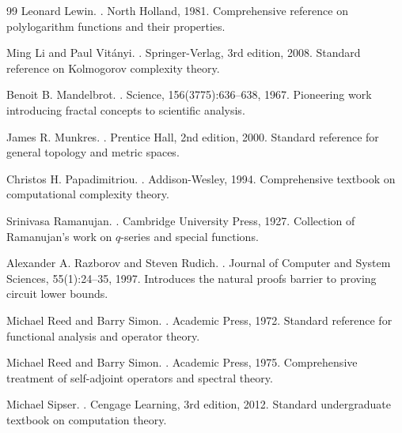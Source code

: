 \documentclass[12pt]{article}
\theoremstyle{plain}
\theoremstyle{definition}
\begin{document}
\begin{thebibliography}{99}
Leonard Lewin.
.
\newblock North Holland, 1981.
\newblock Comprehensive reference on polylogarithm functions and their properties.

Ming Li and Paul Vitányi.
.
\newblock Springer-Verlag, 3rd edition, 2008.
\newblock Standard reference on Kolmogorov complexity theory.

Benoit B. Mandelbrot.
.
\newblock Science, 156(3775):636--638, 1967.
\newblock Pioneering work introducing fractal concepts to scientific analysis.

James R. Munkres.
.
\newblock Prentice Hall, 2nd edition, 2000.
\newblock Standard reference for general topology and metric spaces.

Christos H. Papadimitriou.
.
\newblock Addison-Wesley, 1994.
\newblock Comprehensive textbook on computational complexity theory.

Srinivasa Ramanujan.
.
\newblock Cambridge University Press, 1927.
\newblock Collection of Ramanujan's work on $q$-series and special functions.

Alexander A. Razborov and Steven Rudich.
.
\newblock Journal of Computer and System Sciences, 55(1):24--35, 1997.
\newblock Introduces the natural proofs barrier to proving circuit lower bounds.

Michael Reed and Barry Simon.
.
\newblock Academic Press, 1972.
\newblock Standard reference for functional analysis and operator theory.

Michael Reed and Barry Simon.
.
\newblock Academic Press, 1975.
\newblock Comprehensive treatment of self-adjoint operators and spectral theory.

Michael Sipser.
.
\newblock Cengage Learning, 3rd edition, 2012.
\newblock Standard undergraduate textbook on computation theory.


\end{thebibliography}
\end{document}
